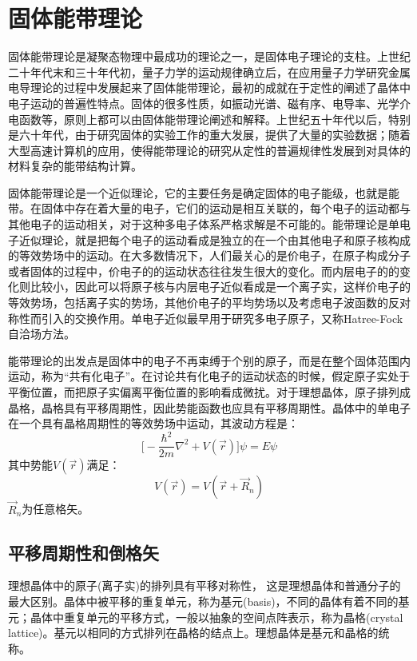 \chapter{固体能带理论} \label{chap:solid}
固体能带理论是凝聚态物理中最成功的理论之一，是固体电子理论的支柱。上世纪二十年代末和三十年代初，量子力学的运动规律确立后，在应用量子力学研究金属电导理论的过程中发展起来了固体能带理论，最初的成就在于定性的阐述了晶体中电子运动的普遍性特点。固体的很多性质，如振动光谱、磁有序、电导率、光学介电函数等，原则上都可以由固体能带理论阐述和解释。上世纪五十年代以后，特别是六十年代，由于研究固体的实验工作的重大发展，提供了大量的实验数据；随着大型高速计算机的应用，使得能带理论的研究从定性的普遍规律性发展到对具体的材料复杂的能带结构计算。

固体能带理论是一个近似理论，它的主要任务是确定固体的电子能级，也就是能带。在固体中存在着大量的电子，它们的运动是相互关联的，每个电子的运动都与其他电子的运动相关，对于这种多电子体系严格求解是不可能的。能带理论是单电子近似理论，就是把每个电子的运动看成是独立的在一个由其他电子和原子核构成的等效势场中的运动。在大多数情况下，人们最关心的是价电子，在原子构成分子或者固体的过程中，价电子的的运动状态往往发生很大的变化。而内层电子的的变化则比较小，因此可以将原子核与内层电子近似看成是一个离子实，这样价电子的等效势场，包括离子实的势场，其他价电子的平均势场以及考虑电子波函数的反对称性而引入的交换作用。单电子近似最早用于研究多电子原子，又称Hatree-Fock自洽场方法。

能带理论的出发点是固体中的电子不再束缚于个别的原子，而是在整个固体范围内运动，称为“共有化电子”。在讨论共有化电子的运动状态的时候，假定原子实处于平衡位置，而把原子实偏离平衡位置的影响看成微扰。对于理想晶体，原子排列成晶格，晶格具有平移周期性，因此势能函数也应具有平移周期性。晶体中的单电子在一个具有晶格周期性的等效势场中运动，其波动方程是：
\begin{equation}\label{eq:solid-1}
  \biggl[-\dfrac{\hbar^2}{2m}\nabla^2+V(\vec r)\biggr]\psi=E\psi
\end{equation}
其中势能$V(\vec r)$满足：
\begin{equation}\label{eq:solid-2}
  V(\vec r)=V(\vec r+\vec R_n)
\end{equation}
$\vec R_n$为任意格矢。

\section{平移周期性和倒格矢}
理想晶体中的原子(离子实)的排列具有平移对称性，%
这是理想晶体和普通分子的最大区别。晶体中被平移的重复单元，称为基元(basis)，不同的晶体有着不同的基元；晶体中重复单元的平移方式，一般以抽象的空间点阵表示，称为晶格(crystal lattice)。基元以相同的方式排列在晶格的结点上。理想晶体是基元和晶格的统称。


